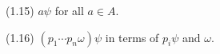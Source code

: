 (1.15) $a\psi$ for all $a \in A$.

(1.16) $(p_1 \cdots p_n\omega)\psi$ in terms of $p_i\psi$ and $\omega$.